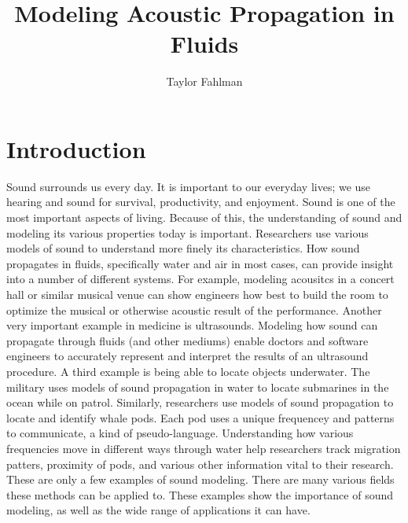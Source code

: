 \documentclass{article}
\begin{document}
\title{Modeling Acoustic Propagation in Fluids\\}
\author{Taylor Fahlman}
\maketitle

\section{Introduction}

Sound surrounds us every day. It is important to our everyday lives; we use hearing and sound for survival,
productivity, and enjoyment. Sound is one of the most important aspects of living. Because of this, the 
understanding of sound and modeling its various properties today is important. Researchers use various
models of sound to understand more finely its characteristics. How sound propagates in fluids, specifically
water and air in most cases, can provide insight into a number of different systems. For example, modeling
acousitcs in a concert hall or similar musical venue can show engineers how best to build the room to
optimize the musical or otherwise acoustic result of the performance. Another very important example
in medicine is ultrasounds. Modeling how sound can propagate through fluids (and other mediums) enable
doctors and software engineers to accurately represent and interpret the results of an ultrasound
procedure. A third example is being able to locate objects underwater. The military uses models
of sound propagation in water to locate submarines in the ocean while on patrol. Similarly,
researchers use models of sound propagation to locate and identify whale pods. Each pod uses
a unique frequencey and patterns to communicate, a kind of pseudo-language. Understanding how
various frequencies move in different ways through water help researchers track migration patters,
proximity of pods, and various other information vital to their research. These are only a few
examples of sound modeling. There are many various fields these methods can be applied to. These
examples show the importance of sound modeling, as well as the wide range of applications it can have.

\newpage
\end{document}
